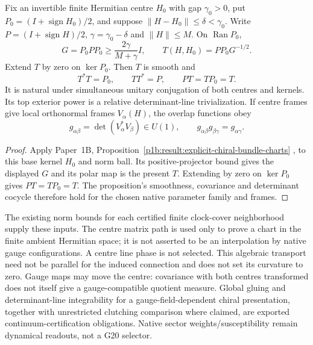 \documentclass[12pt,a4paper]{article}
\begin{document}
\begin{theorem}
\label{p10:thm:v203-chiral-norm-ball-chart}
Fix an invertible finite Hermitian centre $H_0$ with gap $\gamma_0>0$,
put $P_0=(I+\operatorname{sign}H_0)/2$, and suppose
$\|H-H_0\|\le\delta<\gamma_0$. Write
$P=(I+\operatorname{sign}H)/2$, $\gamma=\gamma_0-\delta$ and
$\|H\|\le M$. On $\operatorname{Ran}P_0$,
\[
 G=P_0PP_0\ge\frac{2\gamma}{M+\gamma}I,\qquad
 T(H,H_0)=PP_0G^{-1/2}.
\]
Extend $T$ by zero on $\ker P_0$. Then $T$ is smooth and
\[
 T^*T=P_0,\qquad TT^*=P,\qquad PT=TP_0=T.
\]
It is natural under simultaneous unitary conjugation of both centres and
kernels. Its top exterior power is a relative determinant-line
trivialization. If centre frames give local orthonormal frames
$V_\alpha(H)$, the overlap functions obey
\[
 g_{\alpha\beta}=\det(V_\alpha^*V_\beta)\in U(1),\qquad
 g_{\alpha\beta}g_{\beta\gamma}=g_{\alpha\gamma}.
\]
\end{theorem}
\begin{proof}
Apply Paper~1B, Proposition~\ref{p1b:result:explicit-chiral-bundle-charts}
\cite{Kugelmann2026Paper1B}, to this base kernel $H_0$ and norm ball.
Its positive-projector bound gives the displayed $G$ and its polar map
is the present $T$. Extending by zero on $\ker P_0$ gives
$PT=TP_0=T$. The proposition's smoothness, covariance and determinant
cocycle therefore hold for the chosen native parameter family and frames.
\end{proof}
The existing norm bounds for each certified finite clock-cover
neighborhood supply these inputs. The centre matrix path is used only to
prove a chart in the finite ambient Hermitian space; it is not asserted to
be an interpolation by native gauge configurations. A centre line phase
is not selected. This algebraic transport need not be parallel for the
induced connection and does not set its curvature to zero. Gauge maps may
move the centre: covariance with both centres transformed does not itself
give a gauge-compatible quotient measure. Global gluing and determinant-line integrability for a gauge-field-dependent
chiral presentation, together with unrestricted clutching comparison where
claimed, are exported continuum-certification obligations.  Native sector
weights/susceptibility remain dynamical readouts, not a G20 selector.
\end{document}
